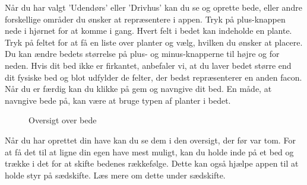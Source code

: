 \begin{minipage}{0.55\textwidth}    
Når du har valgt 'Udendørs' eller 'Drivhus' kan du se og oprette bede, eller andre forskellige områder du ønsker at repræsentere i appen. Tryk på plus-knappen nede i hjørnet for at komme i gang.
Hvert felt i bedet kan indeholde en plante. Tryk på feltet for at få en liste over planter og vælg, hvilken du ønsker at placere. Du kan ændre bedets størrelse på plus- og minus-knapperne til højre og for neden. Hvis dit bed ikke er firkantet, anbefaler vi, at du laver bedet større end dit fysiske bed og blot udfylder de felter, der bedst repræsenterer en anden facon. Når du er færdig kan du klikke på gem og navngive dit bed. En måde, at navngive bede på, kan være at bruge typen af planter i bedet.
\end{minipage} 

\begin{minipage}{0.4\textwidth}
\begin{figure}[H]
    \centering
    \caption{Oversigt over bede}
\end{figure}
\end{minipage} \hfill
\begin{minipage}{0.5\textwidth}
Når du har oprettet din have kan du se dem i den oversigt, der før var tom.
For at få det til at ligne din egen have mest muligt, kan du holde inde på et bed og trække i det for at skifte bedenes rækkefølge. Dette kan også hjælpe appen til at holde styr på sædskifte. Læs mere om dette under sædskifte.
\end{minipage}

